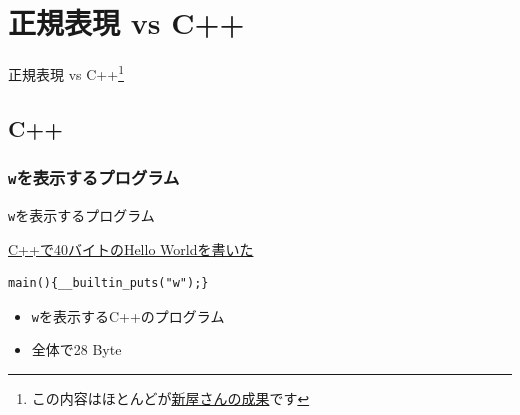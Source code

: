 \documentclass[12pt, unicode, svgnames]{beamer}
\begin{document}
\section{正規表現 vs C++}
\begin{frame}
  \centering
  {\Huge 正規表現 vs C++\footnote[frame]{この内容はほとんどが\href{http://sinya8282.sakura.ne.jp/?p=1013}{新屋さんの成果}です}}
\end{frame}

\subsection{C++}
\begin{frame}[fragile]
  \frametitle{\texttt{w}を表示するプログラム}

  \begin{exampleblock}{\texttt{w}を表示するプログラム}
    \begin{shadequote}[r]{\scriptsize\href{http://d.hatena.ne.jp/pepshiso/20110821/1313947582}{C++で40バイトのHello Worldを書いた}}
\begin{lstlisting}[style=cpp]
main(){__builtin_puts("w");}
\end{lstlisting}
    \end{shadequote}
  \end{exampleblock}

  \begin{itemize}
    \item<2-> \texttt{w}を表示するC++のプログラム
    \item<3-> 全体で28 Byte
  \end{itemize}

\end{frame}
\end{document}
